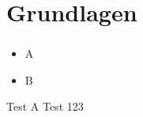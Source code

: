 
\section{Grundlagen}

\begin{frame}[fragile]
\frametitle{\insertsection}

\begin{itemize}
    \item A
    \item B
\end{itemize}

\begin{block}{Test A}
    Test 123
\end{block}

\end{frame}
